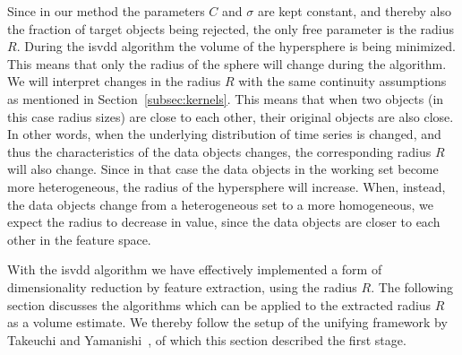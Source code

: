Since in our method the parameters $C$ and $\sigma$ are kept constant, and thereby also the fraction of target objects being rejected, the only free parameter is the radius $R$.
During the \gls{isvdd} algorithm the volume of the hypersphere is being minimized.
This means that only the radius of the sphere will change during the algorithm.
We will interpret changes in the radius $R$ with the same continuity assumptions as mentioned in Section~\ref{subsec:kernels}.
This means that when two objects (in this case radius sizes) are close to each other, their original objects are also close.
In other words, when the underlying distribution of time series is changed, and thus the characteristics of the data objects changes, the corresponding radius $R$ will also change.
Since in that case the data objects in the working set become more heterogeneous, the radius of the hypersphere will increase.
When, instead, the data objects change from a heterogeneous set to a more homogeneous, we expect the radius to decrease in value, since the data objects are closer to each other in the feature space.

With the \gls{isvdd} algorithm we have effectively implemented a form of dimensionality reduction by feature extraction, using the radius $R$.
The following section discusses the algorithms which can be applied to the extracted radius $R$ as a volume estimate.
We thereby follow the setup of the unifying framework by Takeuchi and Yamanishi~\cite{takeuchi2006unifying}, of which this section described the first stage.

